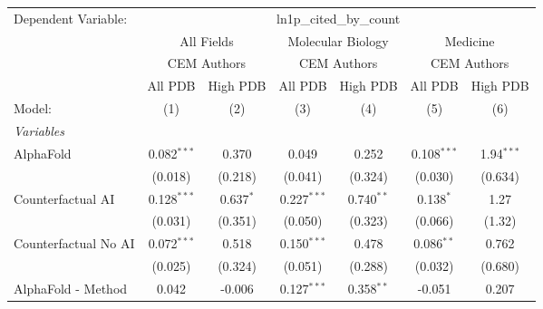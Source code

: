 \begingroup
\centering
\begin{tabular}{lcccccc}
   \tabularnewline \midrule \midrule
   Dependent Variable: & \multicolumn{6}{c}{ln1p\_cited\_by\_count}\\
 & \multicolumn{2}{c}{All Fields} & \multicolumn{2}{c}{Molecular Biology} & \multicolumn{2}{c}{Medicine} \\
\cmidrule(lr){2-3} \cmidrule(lr){4-5} \cmidrule(lr){6-7}
 & \multicolumn{2}{c}{CEM Authors} & \multicolumn{2}{c}{CEM Authors} & \multicolumn{2}{c}{CEM Authors} \\
\cmidrule(lr){2-3} \cmidrule(lr){4-5} \cmidrule(lr){6-7}
 & \multicolumn{1}{c}{All PDB} & \multicolumn{1}{c}{High PDB} & \multicolumn{1}{c}{All PDB} & \multicolumn{1}{c}{High PDB} & \multicolumn{1}{c}{All PDB} & \multicolumn{1}{c}{High PDB} \\
\cmidrule(lr){2-2} \cmidrule(lr){3-3} \cmidrule(lr){4-4} \cmidrule(lr){5-5} \cmidrule(lr){6-6} \cmidrule(lr){7-7}
   Model:                                                     & (1)           & (2)           & (3)           & (4)          & (5)           & (6)\\  
   \midrule
   \emph{Variables}\\
   AlphaFold                                                  & 0.082$^{***}$ & 0.370         & 0.049         & 0.252        & 0.108$^{***}$ & 1.94$^{***}$\\   
                                                              & (0.018)       & (0.218)       & (0.041)       & (0.324)      & (0.030)       & (0.634)\\   
   Counterfactual AI                                          & 0.128$^{***}$ & 0.637$^{*}$   & 0.227$^{***}$ & 0.740$^{**}$ & 0.138$^{*}$   & 1.27\\   
                                                              & (0.031)       & (0.351)       & (0.050)       & (0.323)      & (0.066)       & (1.32)\\   
   Counterfactual No AI                                       & 0.072$^{***}$ & 0.518         & 0.150$^{***}$ & 0.478        & 0.086$^{**}$  & 0.762\\   
                                                              & (0.025)       & (0.324)       & (0.051)       & (0.288)      & (0.032)       & (0.680)\\   
   AlphaFold - Method                                         & 0.042         & -0.006        & 0.127$^{***}$ & 0.358$^{**}$ & -0.051        & 0.207\\   

\end{tabular}
